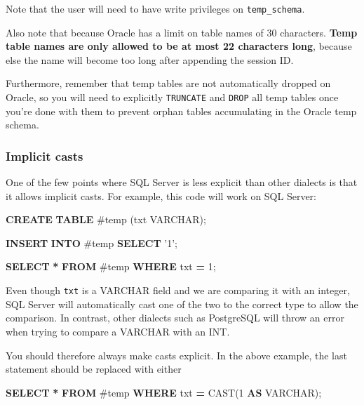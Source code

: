 \documentclass[11pt]{book}
\newenvironment{Shaded}{\begin{snugshade}}{\end{snugshade}}
\newcommand{\DataTypeTok}[1]{\textcolor[rgb]{0.13,0.29,0.53}{#1}}
\newcommand{\DecValTok}[1]{\textcolor[rgb]{0.00,0.00,0.81}{#1}}
\newcommand{\FunctionTok}[1]{\textcolor[rgb]{0.00,0.00,0.00}{#1}}
\newcommand{\KeywordTok}[1]{\textcolor[rgb]{0.13,0.29,0.53}{\textbf{#1}}}
\newcommand{\NormalTok}[1]{#1}
\newcommand{\OperatorTok}[1]{\textcolor[rgb]{0.81,0.36,0.00}{\textbf{#1}}}
\newcommand{\StringTok}[1]{\textcolor[rgb]{0.31,0.60,0.02}{#1}}
\theoremstyle{definition}
\theoremstyle{definition}
\theoremstyle{definition}
\theoremstyle{remark}
\begin{document}
Note that the user will need to have write privileges on \texttt{temp\_schema}.

Also note that because Oracle has a limit on table names of 30 characters. \textbf{Temp table names are only allowed to be at most 22 characters long}, because else the name will become too long after appending the session ID.

Furthermore, remember that temp tables are not automatically dropped on Oracle, so you will need to explicitly \texttt{TRUNCATE} and \texttt{DROP} all temp tables once you're done with them to prevent orphan tables accumulating in the Oracle temp schema.

\hypertarget{implicit-casts}{%
\subsubsection*{Implicit casts}\label{implicit-casts}}

One of the few points where SQL Server is less explicit than other dialects is that it allows implicit casts. For example, this code will work on SQL Server:

\begin{Shaded}
\begin{Highlighting}[]
\KeywordTok{CREATE} \KeywordTok{TABLE}\NormalTok{ #temp (txt }\DataTypeTok{VARCHAR}\NormalTok{);}

\KeywordTok{INSERT} \KeywordTok{INTO}\NormalTok{ #temp}
\KeywordTok{SELECT} \StringTok{'1'}\NormalTok{;}

\KeywordTok{SELECT} \OperatorTok{*} \KeywordTok{FROM}\NormalTok{ #temp }\KeywordTok{WHERE}\NormalTok{ txt }\OperatorTok{=} \DecValTok{1}\NormalTok{;}
\end{Highlighting}
\end{Shaded}

Even though \texttt{txt} is a VARCHAR field and we are comparing it with an integer, SQL Server will automatically cast one of the two to the correct type to allow the comparison. In contrast, other dialects such as PostgreSQL will throw an error when trying to compare a VARCHAR with an INT.

You should therefore always make casts explicit. In the above example, the last statement should be replaced with either

\begin{Shaded}
\begin{Highlighting}[]
\KeywordTok{SELECT} \OperatorTok{*} \KeywordTok{FROM}\NormalTok{ #temp }\KeywordTok{WHERE}\NormalTok{ txt }\OperatorTok{=} \FunctionTok{CAST}\NormalTok{(}\DecValTok{1} \KeywordTok{AS} \DataTypeTok{VARCHAR}\NormalTok{);}
\end{Highlighting}
\end{Shaded}
\end{document}

